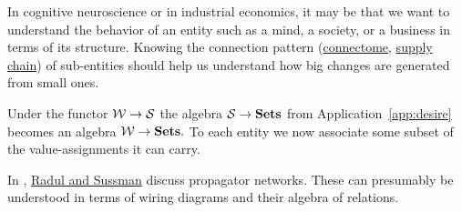 \documentclass[../main/CT4S-EN-RU]{subfiles}
\begin{document}
\begin{exampleRUS}
\end{exampleRUS}

\begin{applicationENG}
In cognitive neuroscience or in industrial economics, it may be that we want to understand the behavior of an entity such as a mind, a society, or a business in terms of its structure. Knowing the connection pattern (\href{http://en.wikipedia.org/wiki/Connectome}{connectome}, \href{http://en.wikipedia.org/wiki/Supply_chain}{supply chain}) of sub-entities should help us understand how big changes are generated from small ones.

Under the functor $\mathcal{W}\rightarrow\mathcal{S}$ the algebra $\mathcal{S}\rightarrow{\mathbf{Sets}}$ from Application~\ref{app:desire} becomes an algebra $\mathcal{W}\rightarrow{\mathbf{Sets}}.$ To each entity we now associate some subset of the value-assignments it can carry. 
\end{applicationENG}

\begin{applicationRUS}
\end{applicationRUS}

\begin{applicationENG}
In \cite{RS}, \href{http://dspace.mit.edu/bitstream/handle/1721.1/44215/MIT-CSAIL-TR-2009-002.pdf?sequence=1}{Radul and Sussman} discuss propagator networks. These can presumably be understood in terms of wiring diagrams and their algebra of relations.
\end{applicationENG}
 
\begin{applicationRUS}
\end{applicationRUS}
\end{document}
